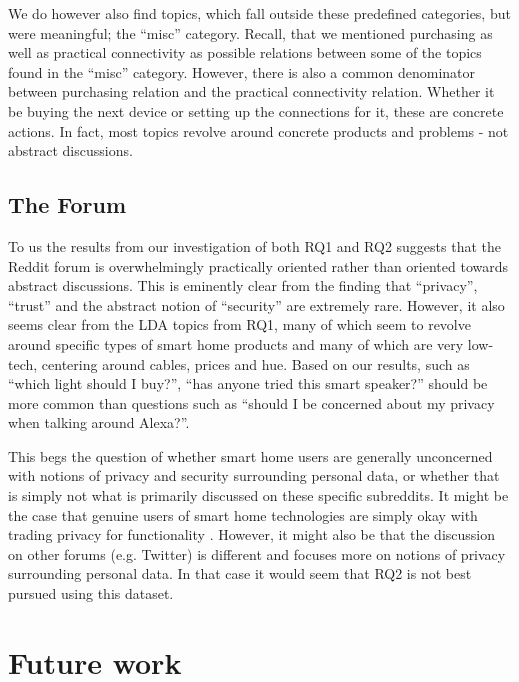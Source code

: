 \documentclass{article}
\begin{document}
We do however also find topics, which fall outside these predefined categories, but were meaningful; the “misc” category. Recall, that we mentioned purchasing as well as practical connectivity as possible relations between some of the topics found in the “misc” category. However, there is also a common denominator between purchasing relation and the practical connectivity relation. Whether it be buying the next device or setting up the connections for it, these are concrete actions. In fact, most topics revolve around concrete products and problems - not abstract discussions. 

    \subsection{The Forum}
    To us the results from our investigation of both RQ1 and RQ2 suggests that the Reddit forum is overwhelmingly practically oriented rather than oriented towards abstract discussions. This is eminently clear from the finding that “privacy”, “trust” and the abstract notion of “security” are extremely rare. However, it also seems clear from the LDA topics from RQ1, many of which seem to revolve around specific types of smart home products and many of which are very low-tech, centering around cables, prices and hue. Based on our results, such as “which light should I buy?”, “has anyone tried this smart speaker?” should be more common than questions such as “should I be concerned about my privacy when talking around Alexa?”. 

This begs the question of whether smart home users are generally unconcerned with notions of privacy and security surrounding personal data, or whether that is simply not what is primarily discussed on these specific subreddits. It might be the case that genuine users of smart home technologies are simply okay with trading privacy for functionality \cite{hubert2020take, tabassum2019investigating}. However, it might also be that the discussion on other forums (e.g. Twitter) is different and focuses more on notions of privacy surrounding personal data. In that case it would seem that RQ2 is not best pursued using this dataset. 

    \section{Future work}
\end{document}
